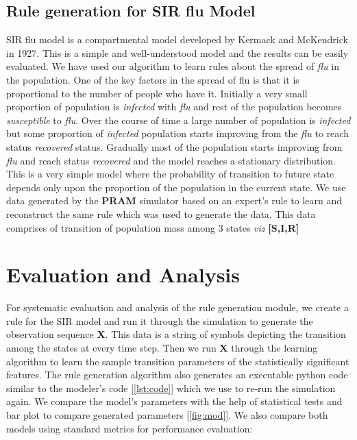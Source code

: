 \documentclass[11pt, a4paper]{article} %
\begin{document}
\subsection{Rule generation for SIR flu Model}
SIR flu model is a compartmental model developed by Kermack and McKendrick in 1927. This is a simple and well-understood model and the results can be easily evaluated. We have used our algorithm to learn rules about the spread of \textit{flu} in the population. One of the key factors in the spread of flu is that it is proportional to the number of people who have it. Initially a very small proportion of population is \textit{infected} with \textit{flu} and rest of the population becomes \textit{susceptible} to \textit{flu}. Over the course of time a large number of population is \textit{infected} but some proportion of \textit{infected} population starts improving from the \textit{flu} to reach status \textit{recovered} status. Gradually most of the population starts improving from \textit{flu} and reach status \textit{recovered} and the model reaches a stationary distribution. This is a very simple model where the probability of transition to future state depends only upon the proportion of the population in the current state. We use data generated by the \textbf{PRAM} simulator based on an expert's rule to learn and reconstruct the same rule which was used to generate the data. This data comprises of transition of population mass among 3 states \textit{viz} \textbf{[S,I,R]}



\section{Evaluation and Analysis}

For systematic evaluation and analysis of the rule generation module, we create a rule for the SIR model and run it through the simulation to generate the observation sequence \textbf{X}. This data is a string of symbols depicting the transition among the states at every time step. Then we run \textbf{X} through the learning algorithm to learn the sample transition parameters of the statistically significant features. The rule generation algorithm also generates an executable python code similar to the modeler's code [\ref{lst:code}] which we use to re-run the simulation again. We compare the model's parameters with the help of statistical tests and bar plot to compare generated parameters [\ref{fig:mod}]. We also compare both models using standard metrics for performance evaluation:
\end{document}
